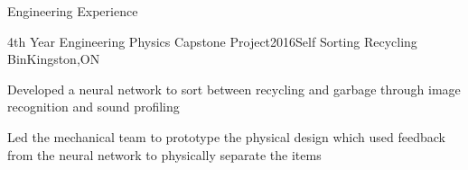 \documentclass{resume2} %
\begin{document}

\begin{rSection}{Engineering Experience}
	
	\begin{rSubsection}{4th Year Engineering Physics Capstone Project}{2016}{Self Sorting Recycling Bin}{Kingston,ON}
		\item Developed a neural network to sort between recycling and garbage through image recognition and sound profiling
		\item Led the mechanical team to prototype the physical design which used feedback from the neural network to physically separate the items 
	\end{rSubsection}
\iffalse
	\begin{rSubsection}{Engineering Physics Design Project}{2015}{Photodiode Research Sensor}{}
		\item Designed and fabricated a research sensor used to assess the properties of photodiodes. Information gathered included efficiency, current and voltage under illuminated and darkened conditions using an Arduino, Matlab and LabVIEW
	\end{rSubsection}

	\begin{rSubsection}{Engineering Design and Practice II}{2014}{Nuclear Waste Gamma Radiation Detector}{Kingston,ON}
		\item Prototyped a Nuclear Waste Gamma Radiation Detector. Through the process of material selection and decision making, the final product was designed for use in areas surrounding the Deep Geologic Repository in Ontario
	\end{rSubsection}

	\begin{rSubsection}{Wirecard AG}{Summer 2014}{Summer Technology Intern}{Singapore}
	\item Redesigned Wirecard's payment processing webpage using HTML and CSS
	\item It is currently used for redirecting online payments to Wirecard's payment processing service	
	\end{rSubsection}
\fi
\end{rSection}
\end{document}
